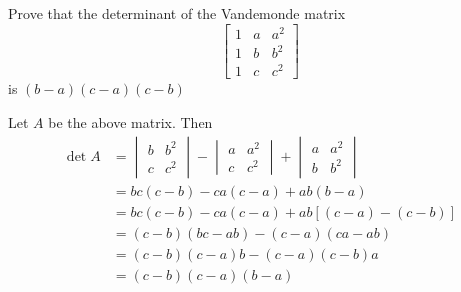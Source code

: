 \documentclass[a4paper, 11pt]{article}
\begin{document}
\begin{problem} 
Prove that the determinant of the Vandemonde matrix \[
    \left[\begin{array}{ccc}
            1 & a & a^2 \\
            1 & b & b^2 \\
            1 & c & c^2
        \end{array}\right]
\]
is \((b-a)(c-a)(c-b)\)
\end{problem}
\begin{solution}
    Let \(A\) be the above matrix. Then
    \begin{align*}
        \det A & =\begin{vmatrix}
                         b & b^2 \\
                         c & c^2
                     \end{vmatrix}
        - \begin{vmatrix}
              a & a^2 \\
              c & c^2
          \end{vmatrix} + \begin{vmatrix}
                              a & a^2 \\
                              b & b^2
                          \end{vmatrix} \\
        &= bc(c-b) - ca(c-a) + ab(b-a) \\
        &= bc(c-b) - ca(c-a) + ab[(c-a) - (c-b)] \\
        &= (c-b)(bc-ab) - (c-a)(ca-ab)\\
        &= (c-b)(c-a)b - (c-a)(c-b)a \\
        &= (c-b)(c-a)(b-a)
    \end{align*}
\end{solution}
\end{document}
